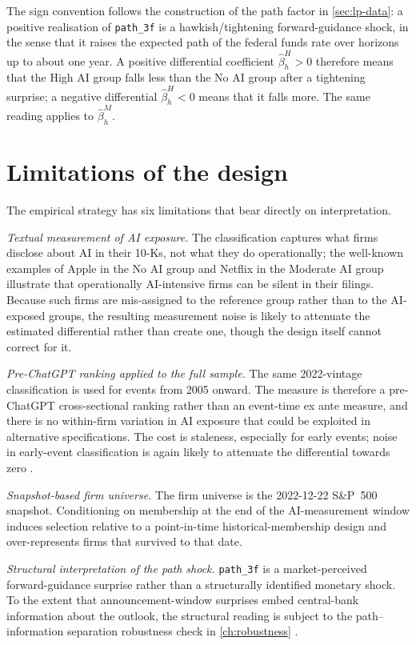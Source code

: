 The sign convention follows the construction of the path factor in \cref{sec:lp-data}: a positive realisation of \texttt{path\_3f} is a hawkish/tightening forward-guidance shock, in the sense that it raises the expected path of the federal funds rate over horizons up to about one year. A positive differential coefficient $\hat\beta_h^H > 0$ therefore means that the High AI group falls less than the No AI group after a tightening surprise; a negative differential $\hat\beta_h^H < 0$ means that it falls more. The same reading applies to $\hat\beta_h^M$.

\section{Limitations of the design}
\label{sec:emp-limitations}

The empirical strategy has six limitations that bear directly on interpretation.

\textit{Textual measurement of AI exposure.} The classification captures what firms disclose about AI in their 10-Ks, not what they do operationally; the well-known examples of Apple in the No AI group and Netflix in the Moderate AI group illustrate that operationally AI-intensive firms can be silent in their filings. Because such firms are mis-assigned to the reference group rather than to the AI-exposed groups, the resulting measurement noise is likely to attenuate the estimated differential rather than create one, though the design itself cannot correct for it.

\textit{Pre-ChatGPT ranking applied to the full sample.} The same 2022-vintage classification is used for events from 2005 onward. The measure is therefore a pre-ChatGPT cross-sectional ranking rather than an event-time ex ante measure, and there is no within-firm variation in AI exposure that could be exploited in alternative specifications. The cost is staleness, especially for early events; noise in early-event classification is again likely to attenuate the differential towards zero \citep{davisHansenSeminarioAmez2020, anteSaggu2025}.

\textit{Snapshot-based firm universe.} The firm universe is the 2022-12-22 S\&P~500 snapshot. Conditioning on membership at the end of the AI-measurement window induces selection relative to a point-in-time historical-membership design and over-represents firms that survived to that date.

\textit{Structural interpretation of the path shock.} \texttt{path\_3f} is a market-perceived forward-guidance surprise rather than a structurally identified monetary shock. To the extent that announcement-window surprises embed central-bank information about the outlook, the structural reading is subject to the path--information separation robustness check in \cref{ch:robustness} \citep{nakamuraSteinsson2018, jarocinskiKaradi2020, bauerSwanson2023, mirandaAgrippinoRicco2021}.

